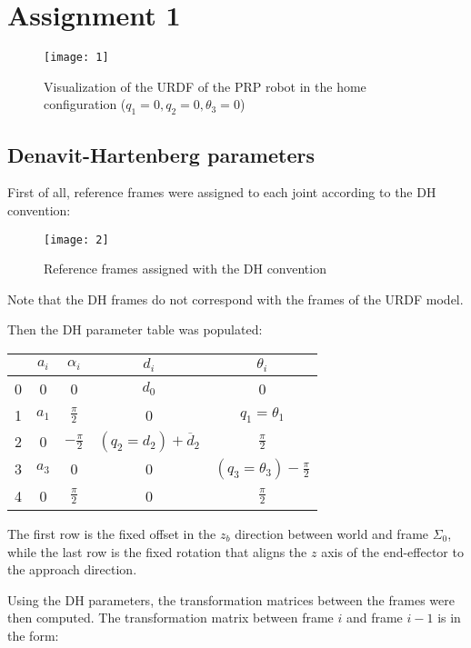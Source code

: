 \section{Assignment 1}

\begin{figure}[h]
\centering
\texttt{[image: 1]}
\caption{Visualization of the URDF of the PRP robot in the home configuration ($ q_1=0,q_2=0,\theta_3=0$)}
\end{figure}

\subsection{Denavit-Hartenberg parameters}

First of all, reference frames were assigned to each joint according to the DH convention:

\begin{figure}[h]
\centering
\texttt{[image: 2]}
\caption{Reference frames assigned with the DH convention}
\end{figure}

Note that the DH frames do not correspond with the frames of the URDF model.

Then the DH parameter table was populated:

\begin{table}[h]
\centering
\begin{tabular}{c|c|c|c|c}
  & $a_i$ & $\alpha_i$       & $d_i$ & $\theta_i$      \\ \hline
0 & 0 & 0 & $d_0$ & 0\\
1 & $a_1$ & $\frac{\pi}{2}$  & 0     & $q_1 =  \theta_1$ \\
2 & 0     & $-\frac{\pi}{2}$ & $(q_2=d_2)+\overline d_2$ & $\frac{\pi}{2}$ \\
3 & $a_3$     & 0                & 0     & $(q_3=\theta_3)-\frac{\pi}{2}$\\
4 & 0 & $\frac{\pi}{2}$ & 0 & $\frac{\pi}{2}$
\end{tabular}
\end{table}

The first row is the fixed offset in the $z_b$ direction between world and frame $\Sigma_0$, while the last row is the fixed rotation that aligns the $z$ axis of the end-effector to the approach direction.

\newpage

Using the DH parameters, the transformation matrices between the frames were then computed. The transformation matrix between frame $i$ and frame $i-1$ is in the form:

